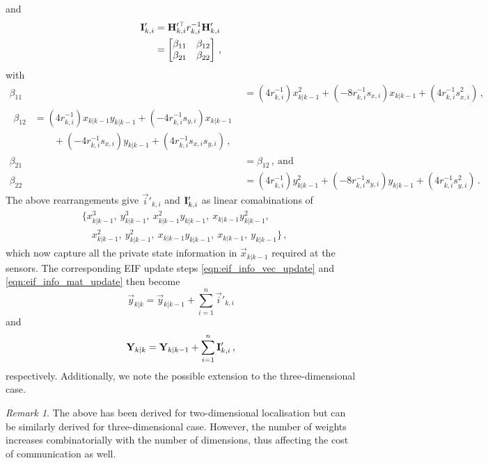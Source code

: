 \documentclass[10pt,letterpaper,oneside,twocolumn,journal]{IEEEtran}
\theoremstyle{definition}
\theoremstyle{definition}
\theoremstyle{remark}
\newtheorem*{remark}{Remark}
\begin{document}
and
\begin{equation}
    \begin{split}
        \mat{I}'_{k,i} &= \mat{H}_{k,i}^{\prime\top} r_{k,i}^{-1}\mat{H}'_{k,i} \\
        &=
        \begin{bmatrix}
            \beta_{11} & \beta_{12} \\
            \beta_{21} & \beta_{22}
        \end{bmatrix}\,,
    \end{split} \label{eqn:hrh_linear_comb}
\end{equation}
with
\begin{align*}
    \beta_{11} &= (4r_{k,i}^{-1})x_{k|k-1}^2 + (-8r_{k,i}^{-1}s_{x,i})x_{k|k-1} + (4r_{k,i}^{-1}s_{x,i}^2)\,, \\
    \begin{split}
        \beta_{12} &= (4r_{k,i}^{-1})x_{k|k-1}y_{k|k-1} + (-4r_{k,i}^{-1}s_{y,i})x_{k|k-1}  \\
        &\qquad+ (-4r_{k,i}^{-1}s_{x,i})y_{k|k-1} + (4r_{k,i}^{-1}s_{x,i}s_{y,i})\,,
    \end{split}\\
    \beta_{21} &= \beta_{12}\,,\ \textrm{and} \\
    \beta_{22} &= (4r_{k,i}^{-1})y_{k|k-1}^2 + (-8r_{k,i}^{-1}s_{y,i})y_{k|k-1} + (4r_{k,i}^{-1}s_{y,i}^2)\,.
\end{align*}
The above rearrangements give $\vec{i}'_{k,i}$ and ${{\mathbf{I}}}'_{k,i}$ as linear comabinations of
\begin{equation}
    \begin{split}
        &\{ x_{k|k-1}^3,\ y_{k|k-1}^3,\ x_{k|k-1}^2y_{k|k-1},\ x_{k|k-1}y_{k|k-1}^2,\\
        &\quad x_{k|k-1}^2,\ y_{k|k-1}^2,\ x_{k|k-1}y_{k|k-1},\ x_{k|k-1},\ y_{k|k-1}\}\,,
    \end{split} \label{eqn:weights_to_broadcast}
\end{equation}
which now capture all the private state information in $\vec{x}_{k|k-1}$ required at the sensors. The corresponding EIF update steps \eqref{eqn:eif_info_vec_update} and \eqref{eqn:eif_info_mat_update} then become
\begin{equation}
    \vec{y}_{k|k} = \vec{y}_{k|k-1} + \sum^n_{i=1}\vec{i}'_{k,i} \label{eqn:eif_modified_vec_update}
\end{equation}
and
\begin{equation}
    \mat{Y}_{k|k} = \mat{Y}_{k|k-1} + \sum^n_{i=1}\mat{I}'_{k,i}\,, \label{eqn:eif_modified_mat_update}
\end{equation}
respectively. Additionally, we note the possible extension to the three-dimensional case.
\begin{remark}
    The above has been derived for two-dimensional localisation but can be similarly derived for three-dimensional case. However, the number of weights increases combinatorially with the number of dimensions, thus affecting the cost of communication as well.
\end{remark}
\end{document}
